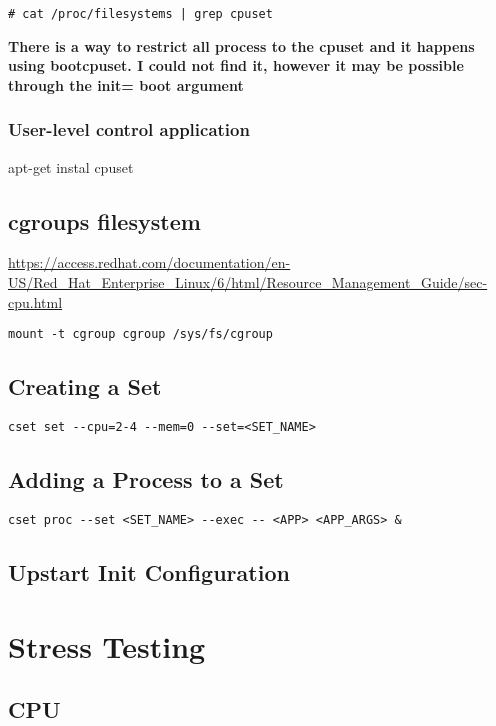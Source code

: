 \begin{lstlisting}
# cat /proc/filesystems | grep cpuset
\end{lstlisting}

\textbf{There is a way to restrict all process to the cpuset and it happens using bootcpuset. I could not find it, however it may be possible through the init= boot argument}


\subsubsection{User-level control application}
apt-get instal cpuset

\subsection{cgroups filesystem}
\url{https://access.redhat.com/documentation/en-US/Red_Hat_Enterprise_Linux/6/html/Resource_Management_Guide/sec-cpu.html}

\begin{lstlisting}
mount -t cgroup cgroup /sys/fs/cgroup
\end{lstlisting}

\subsection{Creating a Set}

\begin{lstlisting}
cset set --cpu=2-4 --mem=0 --set=<SET_NAME>
\end{lstlisting}


\subsection{Adding a Process to a Set}

\begin{lstlisting}
cset proc --set <SET_NAME> --exec -- <APP> <APP_ARGS> & 
\end{lstlisting}

\subsection{Upstart Init Configuration}


\section{Stress Testing}

\subsection{CPU}

